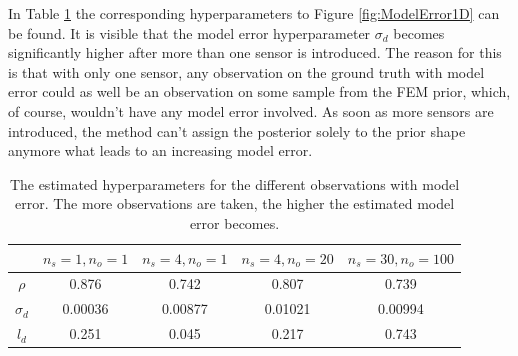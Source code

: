 \documentclass[%
  a4paper,oneside,%
  11pt,%
  smallchapters,
  style=printdev,
  extramargin,
  green,%
  rgb, <cmyk>
  ]{tubsbook}
\begin{document}
In Table \ref{tab:HyperPar1DModelError} the corresponding hyperparameters to Figure \ref{fig:ModelError1D} can be found. It is visible that the model error hyperparameter $\sigma_d$ becomes significantly higher after more than one sensor is introduced. The reason for this is that with only one sensor, any observation on the ground truth with model error could as well be an observation on some sample from the FEM prior, which, of course, wouldn't have any model error involved. As soon as more sensors are introduced, the method can't assign the posterior solely to the prior shape anymore what leads to an increasing model error.


\begin{table}[]
\centering
\caption{The estimated hyperparameters for the different observations with model error. The more observations are taken, the higher the estimated model error becomes.}
\label{tab:HyperPar1DModelError}
\begin{tabular}{@{}ccccc@{}}
\toprule
           & $n_s = 1, n_o = 1$ & $n_s = 4, n_o = 1$ & $n_s = 4, n_o = 20$ & $n_s = 30, n_o = 100$ \\ \midrule
$\rho$     & 0.876              & 0.742              & 0.807               & 0.739                 \\
$\sigma_d$ & 0.00036            & 0.00877            & 0.01021             & 0.00994               \\
$l_d$      & 0.251              & 0.045              & 0.217               & 0.743                 \\ \bottomrule
\end{tabular}
\end{table}
%










\FloatBarrier
\end{document}

